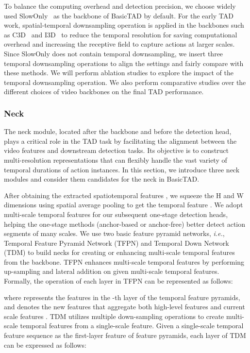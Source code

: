 \documentclass[a4paper,fleqn]{cas-dc}
\begin{document}
To balance the computing overhead and detection precision, we choose widely used SlowOnly~\citep{slowfast} as the backbone of BasicTAD by default.
For the early TAD work,  spatial-temporal downsampling operation is applied in the backbones such as C3D~\citep{c3d} and I3D~\citep{i3d} to reduce the temporal resolution for saving computational overhead and increasing the receptive field to capture actions at larger scales. 
Since SlowOnly does not contain  temporal downsampling, we insert three  temporal downsampling operations to align the settings and fairly compare with these methods. We will perform ablation studies to explore the impact of the temporal downsampling operation.
We also perform comparative studies over the different choices of video backbones on the final TAD performance.

\subsubsection{Neck}
\label{sec:neck}
The neck module, located after the backbone and before the detection head, plays a critical role in the TAD task by facilitating the alignment between the video features and downstream detection tasks. 
Its objective is to construct multi-resolution representations that can flexibly handle the vast variety of temporal durations of action instances.
In this section, we introduce three neck modules and consider them candidates for the neck in BasicTAD.

After obtaining the extracted spatiotemporal features , we squeeze the H and W dimensions using spatial average pooling to get the temporal feature . We adopt multi-scale temporal features for our subsequent one-stage detection heads, helping the one-stage methods (anchor-based or anchor-free) better detect action segments of many scales. We use two basic feature pyramid networks, \emph{i.e.}, Temporal Feature Pyramid Network (TFPN) and Temporal Down Network (TDM) to build necks for creating or enhancing multi-scale temporal features from the backbone. TFPN enhances multi-scale temporal features by performing up-sampling and lateral addition on given multi-scale temporal features. Formally, the operation of each layer in TFPN can be represented as follows:

where  represents the features in the -th layer of the temporal feature pyramids, and  denotes the new features that aggregate both high-level features  and current scale features . TDM utilizes multiple down-sampling operations to create multi-scale temporal features from a single-scale feature. Given a single-scale temporal feature sequence as the first-layer feature of feature pyramids, each layer of TDM can be expressed as follows:
\end{document}
